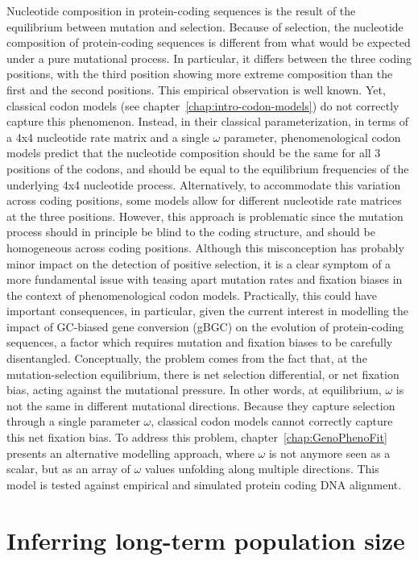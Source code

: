 Nucleotide composition in protein-coding sequences is the result of the equilibrium between mutation and selection.
Because of selection, the nucleotide composition of protein-coding sequences is different from what would be expected under a pure mutational process.
In particular, it differs between the three coding positions, with the third position showing more extreme composition than the first and the second positions.
This empirical observation is well known.
Yet, classical codon models (see chapter~\ref{chap:intro-codon-models}) do not correctly capture this phenomenon.
Instead, in their classical parameterization, in terms of a 4x4 nucleotide rate matrix and a single $\omega$ parameter, phenomenological codon models predict that the nucleotide composition should be the same for all $3$ positions of the codons, and should be equal to the equilibrium frequencies of the underlying 4x4 nucleotide process.
Alternatively, to accommodate this variation across coding positions, some models allow for different nucleotide rate matrices at the three positions.
However, this approach is problematic since the mutation process should in principle be blind to the coding structure, and should be homogeneous across coding positions.
Although this misconception has probably minor impact on the detection of positive selection, it is a clear symptom of a more fundamental issue with teasing apart mutation rates and fixation biases in the context of phenomenological codon models.
Practically, this could have important consequences, in particular, given the current interest in modelling the impact of GC-biased gene conversion (\acrshort{gBGC}) on the evolution of protein-coding sequences, a factor which requires mutation and fixation biases to be carefully disentangled.
Conceptually, the problem comes from the fact that, at the mutation-selection equilibrium, there is net selection differential, or net fixation bias, acting against the mutational pressure.
In other words, at equilibrium, $\omega$ is not the same in different mutational directions.
Because they capture selection through a single parameter $\omega$, classical codon models cannot correctly capture this net fixation bias.
To address this problem, chapter~\ref{chap:GenoPhenoFit} presents an alternative modelling approach, where $\omega$ is not anymore seen as a scalar, but as an array of $\omega$ values unfolding along multiple directions.
This model is tested against empirical and simulated protein coding \acrshort{DNA} alignment.

\section{Inferring long-term population size}
\label{sec-goals:MutSelDrift}

